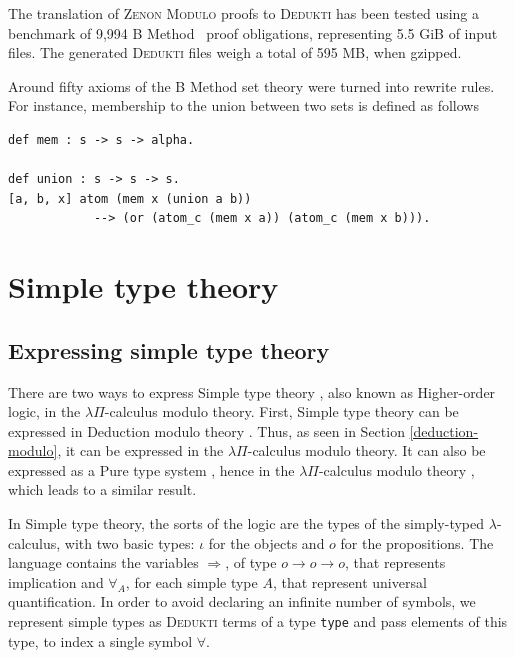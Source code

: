 \documentclass[english]{lipics}
\newcommand\fa{\forall}
\newcommand\lst[1]{{\rm \lstinline{#1}}}
\begin{document}
The translation of \textsc{Zenon Modulo} proofs to \textsc{Dedukti} has been
tested using a benchmark of 9,994 B Method~\cite{B-Book} proof
obligations, representing 5.5 GiB of input files.  The generated
\textsc{Dedukti} files weigh a total of 595 MB, when gzipped.



Around fifty axioms of the B Method set theory were turned into rewrite rules.
For instance, membership to the union between two sets is defined as
follows

\begin{lstlisting}
def mem : s -> s -> alpha.

def union : s -> s -> s.
[a, b, x] atom (mem x (union a b))
            --> (or (atom_c (mem x a)) (atom_c (mem x b))).
\end{lstlisting}

\section{Simple type theory}
\label{sec:simple-type-theory}

\subsection{Expressing simple type theory}
\label{simple-type-theory}

There are two ways to express Simple type theory \cite{Church40}, also
known as Higher-order logic, in the $\lambda \Pi$-calculus modulo
theory. First, Simple type theory can be
expressed in Deduction modulo theory \cite{DHKHOL}. Thus, as seen in
Section \ref{deduction-modulo}, it can be expressed in the $\lambda
\Pi$-calculus modulo theory. It can also be expressed as a Pure
type system \cite{Geuversthesis,Geuvers95}, hence in the $\lambda
\Pi$-calculus modulo theory \cite{CousineauDowek}, which leads to a
similar result.

In Simple type theory, the sorts of the logic are the types of the
simply-typed $\lambda$-calculus, with two basic types: $\iota$ for the
objects and $o$ for the propositions.  The language contains the
variables $\Rightarrow$, of type $o \to o \to o$, that represents
implication and $\forall_A$, for each simple type $A$, that represent
universal quantification. In order to avoid declaring an infinite
number of symbols, we represent simple types as \textsc{Dedukti} terms
of a type \lst{type} and pass elements of this type, to index a single symbol
$\fa$.
\end{document}
